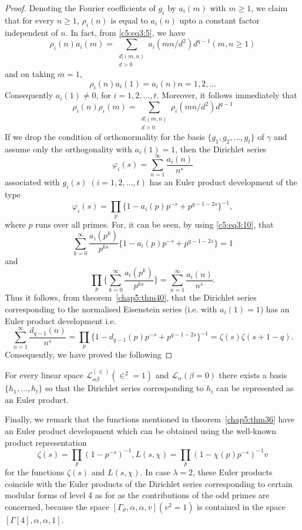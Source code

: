 \begin{proof}
Denoting the Fourier coefficients of $g_i$ by $a_i(m)$ with $m\geq 1$,
we claim that for every $n\geq 1$, $\rho_i(n)$ is equal to $a_i(n)$
upto a constant factor independent of $n$. In fact, from \eqref{c5:eq3:5}, we have 
$$
\rho_i(n) a_i(m) = \sum\limits_{\substack{{d|(m,n)}\\ 
d>0}} a_i(mn/d^2) d^{q-1} (m,n\geq 1)
$$
and on taking $m=1$,
$$
\rho_i(n)a_i(1) = a_i(n) n =1,2,\ldots
$$
Consequently $a_i(1)\neq 0$, for $i=1,2,\ldots, t$. Moreover, it
follows immediately that 
\begin{equation*} 
\rho_i (n)\rho_i(m) = \sum_{\substack{d|(m,n)\\d>0}} 
\rho_i (mn/d^2) d^{q-1} \tag{10}\label{c5:eq3:10} 
\end{equation*}
If we \pageoriginale drop the condition of orthonormality for the
basis $\{g_1, g_2, \ldots , g_t\}$ of $\gamma$ and assume only the
orthogonality with $a_i(1)=1$, then the Dirichlet series
$$
\varphi_i(s) = \sum^{\infty}_{n=1} \frac{a_i(n)}{n^s}
$$
associated with $g_i(s) \; (i=1,2,\ldots ,t)$ has an Euler product
development of the type 
$$
\varphi_i(s) = \prod_p \{1-a_i(p) p^{-s} + p^{q-1-2s}\}^{-1}, 
$$
where $p$ runs over all primes. For, it can be seen, by using \eqref{c5:eq3:10},
that 
$$
\sum^{\infty}_{k=0} \frac{a_i(p^k)}{p^{ks}}  \{1-a_i (p) p^{-s} +
p^{q-1-2s}\} =1
$$
and 
$$
\prod_{p} \{\sum^{\infty}_{k=0} \frac{a_i(p^k)}{p^{ks}}\} =
\sum^{\infty}_{n=1} \frac{a_i(n)}{n^s}.
$$
Thus it follows, from theorem~\ref{chap5:thm40}, that the Dirichlet series
corresponding to the normalised Eisenstein series (i.e. with
$a_i(1)=1$) has an Euler product development i.e.
$$
\sum^{\infty}_{n=1} \frac{d_{q-1}(n)}{n^s} = 
\prod_p\{1-d_{q-1}(p)p^{-s} + p^{q-1-2s} \}^{-1} =\zeta (s) \zeta
(s+1-q). 
$$
Consequently, we have proved the following 
\end{proof}

\begin{thm}\label{chap5:thm43}
For every linear space $\mathscr{L}^{(\in)}_{\alpha\beta}
(\in^2 =1)$ and $\mathscr{L}_{\alpha}(\beta=0)$ there exists a
basis $\{h_1, \ldots, h_t\}$ so that the Dirichlet series
corresponding to $h_i$ can be represented as an Euler product.
\end{thm}

Finally, \pageoriginale we remark that the functions mentioned in
theorem~\ref{chap5:thm36} have an Euler product development which 
can be obtained using the well-known product representation
$$
\zeta(s) = \prod_p(1-p^{-s})^{-1}, L(s,\chi) = \prod_p
(1-\chi(p)p^{-s})^{-1} v
$$
for the functions $\zeta(s)$ and $L(s,\chi)$. In case $\lambda=2$,
these Euler products coincide with the Euler products of the Dirichlet
series corresponding to certain modular forms of level 4 as for as the
contributions of the odd primes are concerned, because the space
$[\Gamma_{\vartheta}, \alpha, \alpha, v](v^2=1)$ is contained in the
space $[\Gamma[4], \alpha, \alpha, 1]$. 

